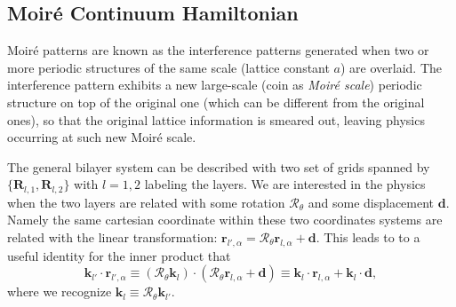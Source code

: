 \subsection{Moir\'e Continuum Hamiltonian}
Moir\'e patterns are known as the interference patterns generated when two or more periodic structures of the same scale (lattice constant $a$) are overlaid. The interference pattern exhibits a new large-scale (coin as \emph{Moir\'{e} scale}) periodic structure on top of the original one (which can be different from the original ones), so that the original lattice information is smeared out, leaving physics occurring at such new Moir\'{e} scale.

The general bilayer system can be described with two set of grids spanned by $\{\bm R_{l,1},\bm R_{l,2}\}$ with $l=1,2$ labeling the layers. We are interested in the physics when the two layers are related with some rotation $\mathcal R_\theta$  and some displacement $\bm d$. Namely the same cartesian coordinate within these two coordinates systems are related with the linear transformation: $\bm{r}_{l',\alpha}=\mathcal R_\theta\bm{r}_{l,\alpha}+\bm d$. This leads to to a useful identity for the inner product that
\begin{equation}\label{eq:twisted dot product}
    \bm k_{l'}\cdot\bm r_{l',\alpha}\equiv(\mathcal R_\theta\bm k_l)\cdot(\mathcal R_\theta\bm r_{l,\alpha}+\bm d)\equiv\bm k_l\cdot\bm r_{l,\alpha}+\bm k_l\cdot\bm d,
\end{equation}
where we recognize $\bm k_l\equiv\mathcal R_\theta\bm k_{l'}$.

